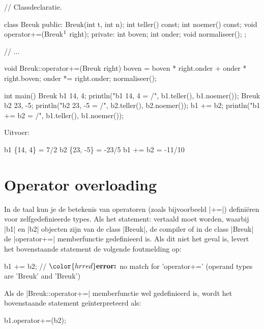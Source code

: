 \begin{cpplstShortInline}
\begin{cpplstfragment}[mathescape=true]
// Classdeclaratie.

class Breuk {
public:
    Breuk(int t, int n);
    int teller() const;
    int noemer() const;
    void operator+=(Breuk$\label{better used const reference 3}\footnotemark$ right);
private:
    int boven;
    int onder;
    void normaliseer();
};

//  ...

void Breuk::operator+=(Breuk right) {
    boven = boven * right.onder + onder * right.boven;
    onder *= right.onder;
    normaliseer();
}

int main() {
    Breuk b1 {14, 4};
    println("b1 {{14, 4}} = {}/{}", b1.teller(), b1.noemer());
    Breuk b2 {23, -5};
    println("b2 {{23, -5}} = {}/{}", b2.teller(), b2.noemer());
    b1 += b2;
    println("b1 += b2 = {}/{}", b1.teller(), b1.noemer());
}
\end{cpplstfragment}


Uitvoer:
\begin{coutput}
b1 \{14, 4\} = 7/2
b2 \{23, -5\} = -23/5
b1 += b2 = -11/10
\end{coutput}

\section{Operator overloading}
In de taal \Cpp{} kun je de betekenis van operatoren (zoals bijvoorbeeld |+=|) definiëren voor zelfgedefinieerde types. Als het statement:
vertaald moet worden, waarbij |b1| en |b2| objecten zijn van de class |Breuk|,  de compiler of in de class |Breuk| de |operator+=| memberfunctie gedefinieerd is. 
Als dit niet het geval is, levert het bovenstaande statement de volgende foutmelding op:
\begin{cpplstfragment}[mathescape=true]
    b1 += b2;
//  $\color{hrred}\textbf{error:}$ no match for 'operator+=' (operand types are 'Breuk' and 'Breuk')
\end{cpplstfragment}

Als de |Breuk::operator+=| memberfunctie wel gedefinieerd is, wordt het bovenstaande statement geïnterpreteerd als:
\begin{cpplstfragment}
    b1.operator+=(b2);
\end{cpplstfragment}


\end{cpplstShortInline}
